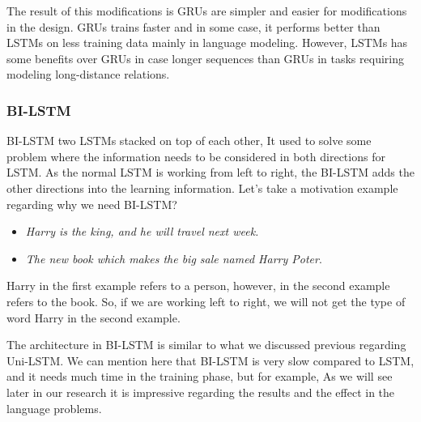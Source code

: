 The result of this modifications is GRUs are simpler and easier for modifications in the design. GRUs trains faster and in some case, it performs better than LSTMs on less training data mainly in language modeling. However, LSTMs has some benefits over GRUs in case longer sequences than GRUs in tasks requiring modeling long-distance relations. 


 
\subsubsection{BI-LSTM}


BI-LSTM two LSTMs stacked on top of each other, It used to solve some problem where the information needs to be considered in both directions for LSTM. As the normal LSTM is working from left to right, the BI-LSTM adds the other directions into the learning information. Let's take a motivation example regarding why we need BI-LSTM?
\begin{itemize}
\item \textit{Harry is the king, and he will travel next week.}
\item \textit{The new book which makes the big sale named Harry Poter}.
\end{itemize}
Harry in the first example refers to a person, however, in the second example refers to the book. So, if we are working left to right, we will not get the type of word Harry in the second example.

The architecture in BI-LSTM is similar to what we discussed previous regarding Uni-LSTM. We can mention here that BI-LSTM is very slow compared to LSTM, and it needs much time in the training phase, but for example, As we will see later in our research it is impressive regarding the results and the effect in the language problems.
